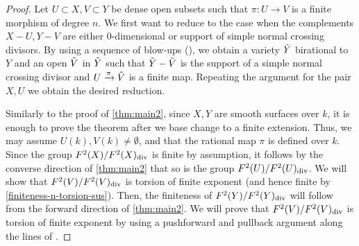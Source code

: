 \documentclass[12pt]{amsart}
\theoremstyle{remark}
\renewcommand{\1}{{\mathbb{S}}}
\newcommand{\<}{\langle}
\renewcommand{\>}{\rangle}
\newcommand{\dv}{{\rm div}}
\begin{document}
\begin{proof} 
Let $U\subset X, V\subset Y$ be dense open subsets such that $\pi:U\to V$ is a finite morphism of degree $n$. We first want to reduce to the case when the complements $X-U, Y-V$ are either $0$-dimensional or support of simple normal crossing divisors. 
By using a sequence of blow-ups (\cite[Corollary 0.4]{CJS}), we obtain a variety $\Tilde{Y}$ birational to $Y$ and an open $\Tilde{V}$ in $\Tilde{Y}$ such that $\Tilde{Y}-\Tilde{V}$ is  the support of a simple normal crossing divisor and $U\xrightarrow{\pi} \Tilde{V}$ is a finite map. Repeating the argument for the pair $X, U$ we  obtain the desired reduction. 

Similarly to the proof of \autoref{thm:main2}, since $X, Y$ are smooth surfaces over $k$, it is enough to prove the theorem after we base change to a finite extension. Thus, we may assume $U(k), V(k)\neq\emptyset$, and that the rational map $\pi$ is defined over $k$. 
Since the group $F^2(X)/F^2(X)_{\dv}$ is finite by assumption, it follows by the converse direction of \autoref{thm:main2} that so is the group $F^2(U)/F^2(U)_{\dv}$. We will show that $F^2(V)/F^2(V)_{\dv}$ is torsion of finite exponent (and hence finite by \autoref{finiteness-n-torsion-sus}). Then, the finiteness of $F^2(Y)/F^2(Y)_{\dv}$ will follow from the forward direction of \autoref{thm:main2}. 
We will prove that $F^2(V)/F^2(V)_{\dv}$ is torsion of finite exponent by using a pushforward and pullback argument along the lines of \cite[Theorem 1.2]{GL24}.  


\end{proof}
\end{document}

